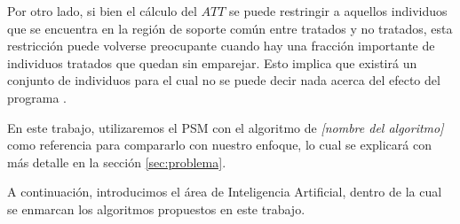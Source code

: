\documentclass[../../main.tex]{subfiles}
\begin{document}
Por otro lado, si bien el cálculo del \(ATT\) se puede restringir a aquellos individuos
que se encuentra en la región de soporte común entre tratados y no tratados, esta
restricción puede volverse preocupante cuando hay una fracción importante de individuos
tratados que quedan sin emparejar. Esto implica que existirá un conjunto de individuos
para el cual no se puede decir nada acerca del efecto del programa \cite{bernal}.

\bigskip
En este trabajo, utilizaremos el PSM con el algoritmo de \textit{[nombre del algoritmo]}
como referencia para compararlo con nuestro enfoque, lo cual se explicará con más detalle
en la sección \ref{sec:problema}.

A continuación, introducimos el área de Inteligencia Artificial, dentro de la cual se
enmarcan los algoritmos propuestos en este trabajo.
\end{document}
